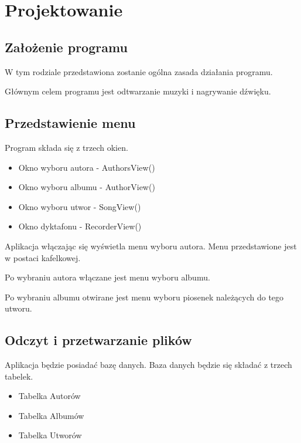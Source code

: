 	\newpage
\section{Projektowanie}		%

\subsection{Założenie programu}
W tym rodziale przedstawiona zostanie ogólna zasada działania programu.

Głównym celem programu jest odtwarzanie muzyki i nagrywanie dźwięku.

\subsection{Przedstawienie menu}
Program składa się z trzech okien.

\begin{itemize}
	\item Okno wyboru autora - AuthorsView()
	\item Okno wyboru albumu - AuthorView()
	\item Okno wyboru utwor - SongView()
	\item Okno dyktafonu - RecorderView()
\end{itemize}

Aplikacja włączając się wyświetla menu wyboru autora. Menu przedstawione jest w postaci kafelkowej.

Po wybraniu autora włączane jest menu wyboru albumu.

Po wybraniu albumu otwirane jest menu wyboru piosenek należących do tego utworu.

\subsection{Odczyt i przetwarzanie plików}

Aplikacja będzie posiadać bazę danych. Baza danych będzie się składać z trzech tabelek.

\begin{itemize}
	\item Tabelka Autorów
	\item Tabelka Albumów
	\item Tabelka Utworów
\end{itemize}

